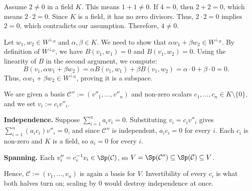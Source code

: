 \begin{exercisesolution}
\label{sol:two_nonzero_four_nonzero}
Assume $2 \neq 0$ in a field $K$. This means $1 + 1 \neq 0$. If $4 = 0$, then $2 + 2 = 0$, which means $2 \cdot 2 = 0$. Since $K$ is a field, it has no zero divisors. Thus, $2 \cdot 2 = 0$ implies $2 = 0$, which contradicts our assumption. Therefore, $4 \neq 0$.
\end{exercisesolution}

\begin{exercisesolution}
\label{sol:orthogonal_complement_wrt_B}
Let $w_1, w_2 \in W^{\perp_B}$ and $\alpha, \beta \in K$. We need to show that $\alpha w_1 + \beta w_2 \in W^{\perp_B}$. By definition of $W^{\perp_B}$, we have $B(v_1, w_1) = 0$ and $B(v_1, w_2) = 0$. Using the linearity of $B$ in the second argument, we compute:
\[
B(v_1, \alpha w_1 + \beta w_2) = \alpha B(v_1, w_1) + \beta B(v_1, w_2) = \alpha \cdot 0 + \beta \cdot 0 = 0.
\]
Thus, $\alpha w_1 + \beta w_2 \in W^{\perp_B}$, proving it is a subspace.
\end{exercisesolution}

\begin{exercisesolution}
\label{sol:scaled_family_is_basis}
We are given a basis $\mathcal{C}'' := (v''_1, \dots, v''_n)$ and non-zero scalars $c_1, \dots, c_n \in K \setminus \{0\}$, and we set $v_i := c_i v''_i$.

\textbf{Independence.} Suppose $\sum_{i=1}^n a_i v_i = 0$. Substituting $v_i = c_i v''_i$ gives $\sum_{i=1}^n (a_i c_i) v''_i = 0$, and since $\mathcal{C}''$ is independent, $a_i c_i = 0$ for every $i$. Each $c_i$ is non-zero and $K$ is a field, so $a_i = 0$ for every $i$.

\textbf{Spanning.} Each $v''_i = c_i^{-1} v_i \in \Sp(\mathcal{C})$, so $V = \Sp(\mathcal{C}'') \subseteq \Sp(\mathcal{C}) \subseteq V$.

Hence, $\mathcal{C} := (v_1, \dots, v_n)$ is again a basis for $V$. Invertibility of every $c_i$ is what both halves turn on; scaling by $0$ would destroy independence at once.
\end{exercisesolution}

